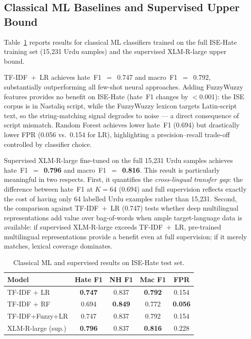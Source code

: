 \documentclass{article}
\begin{document}
\subsection{Classical ML Baselines and Supervised Upper Bound}

Table~\ref{tab:classical_results} reports results for classical ML
classifiers trained on the full ISE-Hate training set (15{,}231 Urdu samples)
and the supervised XLM-R-large upper bound.

TF-IDF~$+$~LR achieves hate~F1~$=$~0.747 and macro~F1~$=$~0.792, substantially
outperforming all few-shot neural approaches.
Adding FuzzyWuzzy features provides no benefit on ISE-Hate (hate~F1 changes
by $<$0.001): the ISE corpus is in Nastaliq script, while the FuzzyWuzzy
lexicon targets Latin-script text, so the string-matching signal degrades to
noise --- a direct consequence of script mismatch.
Random Forest achieves lower hate~F1 (0.694) but drastically lower FPR
(0.056 vs.\ 0.154 for LR), highlighting a precision--recall trade-off
controlled by classifier choice.

Supervised XLM-R-large fine-tuned on the full 15{,}231 Urdu samples achieves
hate~F1~$=$~\textbf{0.796} and macro~F1~$=$~\textbf{0.816}.
This result is particularly meaningful in two respects.
First, it quantifies the \emph{cross-lingual transfer gap}: the difference
between hate~F1 at $K=64$ (0.694) and full supervision reflects exactly
the cost of having only 64 labelled Urdu examples rather than 15{,}231.
Second, the comparison against TF-IDF~$+$~LR (0.747) tests whether deep
multilingual representations add value over bag-of-words when ample
target-language data is available: if supervised XLM-R-large exceeds
TF-IDF~$+$~LR, pre-trained multilingual representations provide a benefit
even at full supervision; if it merely matches, lexical coverage dominates.

\begin{table}[h]
\centering
\caption{Classical ML and supervised results on ISE-Hate test set.}
\label{tab:classical_results}
\vskip 0.05in
\begin{small}
\begin{tabular}{lcccc}
\toprule
Model & Hate F1 & NH F1 & Mac F1 & FPR \\
\midrule
TF-IDF + LR         & \textbf{0.747} & 0.837 & \textbf{0.792} & 0.154 \\
TF-IDF + RF         & 0.694 & \textbf{0.849} & 0.772 & \textbf{0.056} \\
TF-IDF+Fuzzy+LR     & 0.747 & 0.837 & 0.792 & 0.154 \\
\midrule
XLM-R-large (sup.)  & \textbf{0.796} & 0.837 & \textbf{0.816} & 0.228 \\
\bottomrule
\end{tabular}
\end{small}
\end{table}
\end{document}
